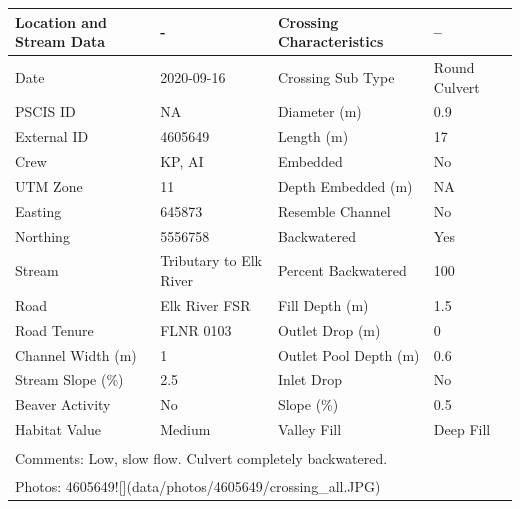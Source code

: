 \documentclass[
]{book}
\begin{document}
\begin{tabular}{l|l|l|l}
\hline
Location and Stream Data & - & Crossing Characteristics & --\\
\hline
Date & 2020-09-16 & Crossing Sub Type & Round Culvert\\
\hline
PSCIS ID & NA & Diameter (m) & 0.9\\
\hline
External ID & 4605649 & Length (m) & 17\\
\hline
Crew & KP, AI & Embedded & No\\
\hline
UTM Zone & 11 & Depth Embedded (m) & NA\\
\hline
Easting & 645873 & Resemble Channel & No\\
\hline
Northing & 5556758 & Backwatered & Yes\\
\hline
Stream & Tributary to Elk River & Percent Backwatered & 100\\
\hline
Road & Elk River FSR & Fill Depth (m) & 1.5\\
\hline
Road Tenure & FLNR 0103 & Outlet Drop (m) & 0\\
\hline
Channel Width (m) & 1 & Outlet Pool Depth (m) & 0.6\\
\hline
Stream Slope (\%) & 2.5 & Inlet Drop & No\\
\hline
Beaver Activity & No & Slope (\%) & 0.5\\
\hline
Habitat Value & Medium & Valley Fill & Deep Fill\\
\hline
\multicolumn{4}{l}{\textsuperscript{} Comments: Low, slow flow. Culvert completely backwatered.}\\
\multicolumn{4}{l}{\textsuperscript{} Photos: 4605649![](data/photos/4605649/crossing\_all.JPG)}\\
\end{tabular}
\end{document}
